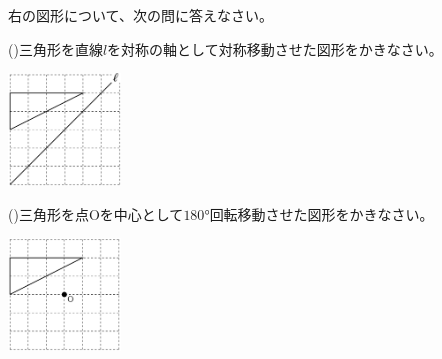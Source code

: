 \documentclass[
  12pt,a4paper,lualatex,ja=standard]{bxjsarticle}
\begin{document}
\begin{flushleft}
\begin{multicols}{2}

\noindent{} \hspace{1pt}右の図形について、次の問に答えなさい。

\setcounter{skaunta}{0}

()\hspace{2.5pt}三角形を直線$l$を対称の軸として対称移動させた図形をかきなさい。

\vspace*{\fill}

\columnbreak

\begin{center}
\def\@captype{figure}
\includegraphics[width=30mm]{media/tu4.png}


\end{center}

\end{multicols}

\begin{multicols}{2}

()\hspace{2.5pt}三角形を点Oを中心として$\ang{180}$回転移動させた図形をかきなさい。

\vspace*{\fill}

\columnbreak

\begin{center}
\def\@captype{figure}
\includegraphics[width=30mm]{media/image3.png}

\end{center}

\end{multicols}

\newpage


\end{flushleft}
\end{document}
